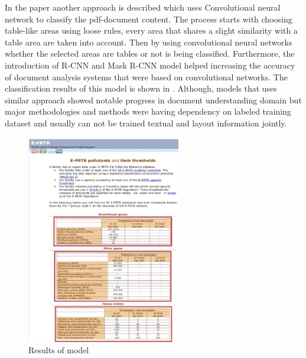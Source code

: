 In the paper \cite{hao2016table} another approach is described which uses Convolutional neural network to classify the pdf-document content. The process starts with choosing table-like areas using loose rules, every area that shares a slight similarity with a table area are taken into account. Then by using convolutional neural networks whether the selected areas are tables or not is being classified. Furthermore, the introduction of R-CNN \cite{ren2015faster} and Mask R-CNN \cite{he2017mask} model helped increasing the accuracy of document analysis systems that were based on convolutional networks. The classification results of this model is shown in . Although, models that uses similar approach showed notable progress in document understanding domain but major methodologies and methods were having dependency on labeled training dataset and usually can not be trained textual and layout information jointly. 

\begin{figure}[ht]
    \centering
    \includegraphics[width=0.6\textwidth]{chapters/images/Literature_review/A_table_detection_method_02.jpg}
    \caption{Results of \cite{hao2016table} model}
    \label{fig:Results_tabel_detection}
\end{figure}


